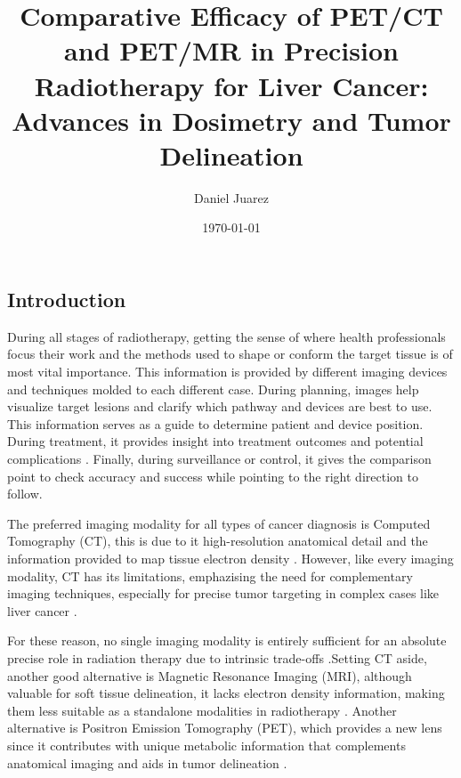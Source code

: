 \documentclass[11pt]{article} %
\title{Comparative Efficacy of PET/CT and PET/MR in Precision Radiotherapy for Liver Cancer: Advances in Dosimetry and Tumor Delineation}
\author{Daniel Juarez}
\date{\today}
\begin{document}
\maketitle

\begin{multicols}{2}

\section{Introduction}


During all stages of radiotherapy, getting the sense of where health professionals focus their work and the methods used to shape or conform the target tissue is of most vital importance. This information is provided by different imaging devices and techniques molded to each different case. During planning, images help visualize target lesions and clarify which pathway and devices are best to use. This information serves as a guide to determine patient and device position. During treatment, it provides insight into treatment outcomes and potential complications \cite{decazes2021}. Finally, during surveillance or control, it gives the comparison point to check accuracy and success while pointing to the right direction to follow.

The preferred imaging modality for all types of cancer diagnosis is Computed Tomography (CT), this is due to it high-resolution anatomical detail and the information provided to map tissue electron density \cite{decazes2021,yan2024}. However, like every imaging modality, CT has its limitations, emphazising the need for complementary imaging techniques, especially for precise tumor targeting in complex cases like liver cancer \cite{yan2024}.

For these reason, no single imaging modality is entirely sufficient for an absolute precise role in radiation therapy due to intrinsic trade-offs \cite{decazes2021}.Setting CT aside, another good alternative is Magnetic Resonance Imaging (MRI), although valuable for soft tissue delineation, it lacks electron density information, making them less suitable as a standalone modalities in radiotherapy \cite{decazes2021}. Another alternative is Positron Emission Tomography (PET), which provides a new lens since it contributes with unique metabolic information that complements anatomical imaging and aids in tumor delineation \cite{decazes2021}.


\end{multicols}
\end{document}
